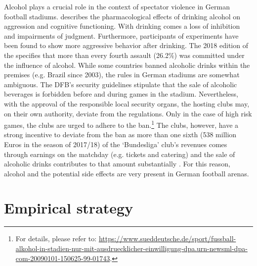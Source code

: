 \documentclass[11pt, a4paper]{article} %
\begin{document}
Alcohol plays a crucial role in the context of spectator violence in German football stadiums. \cite{cook2013virtuous} describes the pharmacological effects of drinking alcohol on aggression and cognitive functioning. With drinking comes a loss of inhibition and impairments of judgment. Furthermore, participants of experiments have been found to show more aggressive behavior after drinking. The 2018 edition of the \citeauthor{PCS2018} specifies that more than every fourth assault (26.2\%) was committed under the influence of alcohol. While some countries banned alcoholic drinks within the premises (e.g. Brazil since 2003), the rules in German stadiums are somewhat ambiguous. The DFB's security guidelines stipulate that the sale of alcoholic beverages is forbidden before and during games in the stadium. Nevertheless, with the approval of the responsible local security organs, the hosting clubs may, on their own authority, deviate from the regulations. Only in the case of high risk games, the clubs are urged to adhere to the ban.\footnote{For details, please refer to: \href{https://www.sueddeutsche.de/sport/fussball-alkohol-in-stadien-nur-mit-ausdruecklicher-einwilligung-dpa.urn-newsml-dpa-com-20090101-150625-99-01743}{https://www.sueddeutsche.de/sport/fussball-alkohol-in-stadien-nur-mit-ausdruecklicher-einwilligung-dpa.urn-newsml-dpa-com-20090101-150625-99-01743}.} The clubs, however, have a strong incentive to deviate from the ban as more than one sixth (538 million Euros in the season of 2017/18) of the `Bundesliga' club's revenues comes through earnings on the matchday (e.g. tickets and catering) and the sale of alcoholic drinks contributes to that amount substantially \citep{deloitte2019report}. For this reason, alcohol and the potential side effects are very present in German football arenas.




	

\bigskip
\section{Empirical strategy}\label{sec_soc_ext:empirical_strategy}
\end{document}
